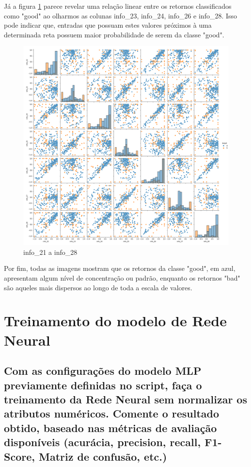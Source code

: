 \documentclass[12pt]{article}
\begin{document}
Já a figura \ref{fig:pairplot21a28} parece revelar uma relação linear entre os retornos classificados como "good" ao olharmos as colunas info\_23, info\_24, info\_26 e info\_28. Isso pode indicar que, entradas que possuam estes valores próximos à uma determinada reta possuem maior probabilidade de serem da classe "good".

\begin{figure}[H]
	\centering
	\includegraphics[width=1.1\linewidth]{../pairplot21a28}
	\caption{info\_21 a info\_28}
	\label{fig:pairplot21a28}
\end{figure}

Por fim, todas as imagens mostram que os retornos da classe "good", em azul, apresentam algum nível de concentração ou padrão, enquanto os retornos "bad" são aqueles mais dispersos ao longo de toda a escala de valores.

\section{Treinamento do modelo de Rede Neural}

\subsection{Com as configurações do modelo MLP previamente definidas no script, faça o treinamento da Rede Neural sem normalizar os atributos	numéricos. Comente o resultado obtido, baseado nas métricas de	avaliação disponíveis (acurácia, precision, recall, F1-Score, Matriz de	confusão, etc.)}
\end{document}
